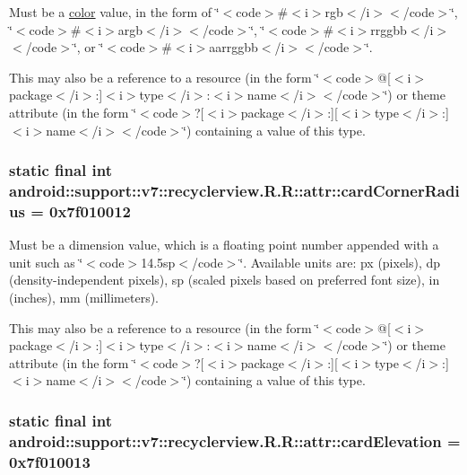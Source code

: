 Must be a \hyperlink{classandroid_1_1support_1_1v7_1_1recyclerview_1_1_r_1_1color}{color} value, in the form of \char`\"{}$<$code$>$\#$<$i$>$rgb$<$/i$>$$<$/code$>$\char`\"{}, \char`\"{}$<$code$>$\#$<$i$>$argb$<$/i$>$$<$/code$>$\char`\"{}, \char`\"{}$<$code$>$\#$<$i$>$rrggbb$<$/i$>$$<$/code$>$\char`\"{}, or \char`\"{}$<$code$>$\#$<$i$>$aarrggbb$<$/i$>$$<$/code$>$\char`\"{}. 

This may also be a reference to a resource (in the form \char`\"{}$<$code$>$@\mbox{[}$<$i$>$package$<$/i$>$:\mbox{]}$<$i$>$type$<$/i$>$:$<$i$>$name$<$/i$>$$<$/code$>$\char`\"{}) or theme attribute (in the form \char`\"{}$<$code$>$?\mbox{[}$<$i$>$package$<$/i$>$:\mbox{]}\mbox{[}$<$i$>$type$<$/i$>$:\mbox{]}$<$i$>$name$<$/i$>$$<$/code$>$\char`\"{}) containing a value of this type. \hypertarget{classandroid_1_1support_1_1v7_1_1recyclerview_1_1_r_1_1attr_912b0bd78f18936e61164506ef0ecc6b}{
\subsubsection[{cardCornerRadius}]{\setlength{\rightskip}{0pt plus 5cm}static final int android::support::v7::recyclerview.R.R::attr::cardCornerRadius = 0x7f010012}}
\label{classandroid_1_1support_1_1v7_1_1recyclerview_1_1_r_1_1attr_912b0bd78f18936e61164506ef0ecc6b}


Must be a dimension value, which is a floating point number appended with a unit such as \char`\"{}$<$code$>$14.5sp$<$/code$>$\char`\"{}. Available units are: px (pixels), dp (density-independent pixels), sp (scaled pixels based on preferred font size), in (inches), mm (millimeters). 

This may also be a reference to a resource (in the form \char`\"{}$<$code$>$@\mbox{[}$<$i$>$package$<$/i$>$:\mbox{]}$<$i$>$type$<$/i$>$:$<$i$>$name$<$/i$>$$<$/code$>$\char`\"{}) or theme attribute (in the form \char`\"{}$<$code$>$?\mbox{[}$<$i$>$package$<$/i$>$:\mbox{]}\mbox{[}$<$i$>$type$<$/i$>$:\mbox{]}$<$i$>$name$<$/i$>$$<$/code$>$\char`\"{}) containing a value of this type. \hypertarget{classandroid_1_1support_1_1v7_1_1recyclerview_1_1_r_1_1attr_c07c7c3193bb07f00406b6f8521ceaf4}{
\subsubsection[{cardElevation}]{\setlength{\rightskip}{0pt plus 5cm}static final int android::support::v7::recyclerview.R.R::attr::cardElevation = 0x7f010013}}
\label{classandroid_1_1support_1_1v7_1_1recyclerview_1_1_r_1_1attr_c07c7c3193bb07f00406b6f8521ceaf4}



